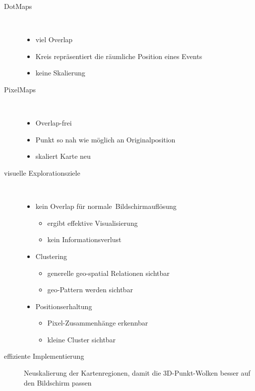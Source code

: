 \begin{description}
	\item[DotMaps] \ \\\vspace*{-\baselineskip}
		\begin{itemize}
			\item viel Overlap
			\item Kreis repräsentiert die räumliche Position eines Events
			\item keine Skalierung
		\end{itemize}
	\item[PixelMaps] \ \\\vspace*{-\baselineskip}
		\begin{itemize}
			\item Overlap-frei
			\item Punkt so nah wie möglich an Originalposition
			\item skaliert Karte neu
		\end{itemize}
	\item[visuelle Explorationsziele] \ \\\vspace*{-\baselineskip}
		\begin{itemize}
			\item kein Overlap für \glqq normale\grqq\ Bildschirmauflösung
				\begin{itemize}
					\item ergibt effektive Visualisierung
					\item kein Informationsverlust
				\end{itemize}
			\item Clustering
				\begin{itemize}
					\item generelle geo-spatial Relationen sichtbar
					\item geo-Pattern werden sichtbar
				\end{itemize}
			\item Positionserhaltung
				\begin{itemize}
					\item Pixel-Zusammenhänge erkennbar
					\item kleine Cluster sichtbar
				\end{itemize}
		\end{itemize}
	\item[effiziente Implementierung] Neuskalierung der Kartenregionen, damit die 3D-Punkt-Wolken besser auf den Bildschirm passen
\end{description}